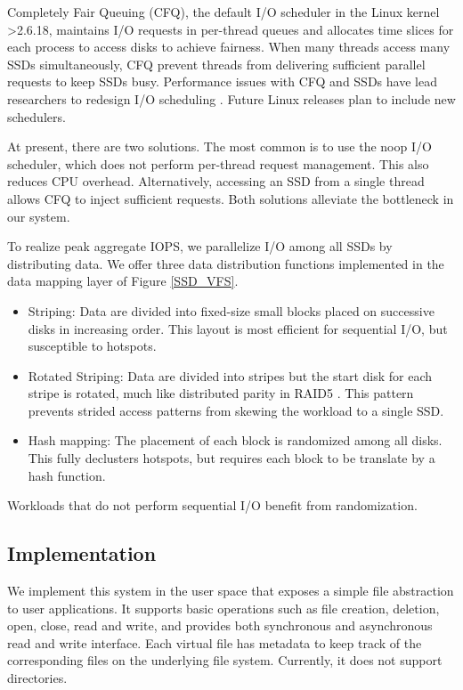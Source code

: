 Completely Fair Queuing (CFQ), the default I/O scheduler in the Linux kernel >2.6.18,
maintains I/O requests in per-thread queues and allocates time slices for each process
to access disks to achieve fairness. 
When many threads access many SSDs simultaneously, CFQ prevent threads 
from delivering sufficient parallel requests to keep SSDs busy.
Performance issues with CFQ and SSDs have lead researchers to redesign 
I/O scheduling \cite{Park12}. Future Linux releases plan to include new schedulers.

At present, there are two solutions.  The most common is to use the 
noop I/O scheduler, which does not perform per-thread
request management.  This also reduces CPU overhead.  Alternatively, accessing
an SSD from a single thread allows CFQ to inject sufficient requests.
Both solutions alleviate the bottleneck in our system.  

\label{data_layout}
To realize peak aggregate IOPS, we parallelize I/O among all SSDs by 
distributing data.  We offer three data distribution functions implemented in 
the data mapping layer of Figure \ref{SSD_VFS}.

\vspace{-10pt}
\begin{itemize}
\addtolength{\itemsep}{-5pt}
	\item Striping: Data are divided into fixed-size small blocks placed on 
    successive disks in increasing order.  This layout is most efficient
    for sequential I/O, but susceptible to hotspots.
	\item Rotated Striping: Data are divided into stripes but the start disk for
    each stripe is rotated, much like distributed parity in RAID5 \cite{raid}.
    This pattern prevents strided access patterns from skewing the workload
    to a single SSD.
	\item Hash mapping: The placement of each block is randomized
    among all disks.  This fully declusters hotspots, but requires each
    block to be translate by a hash function.
\end{itemize}
\vspace{-10pt}

\noindent Workloads that do not perform sequential I/O benefit from randomization.

\subsection{Implementation}
We implement this system in the user space that exposes a simple
file abstraction to user applications. It supports basic operations
such as file creation, deletion, open, close, read and write,
and provides both synchronous and asynchronous read and write interface.
Each virtual file has metadata to keep track of the corresponding files on the
underlying file system. Currently, it does not support directories.


